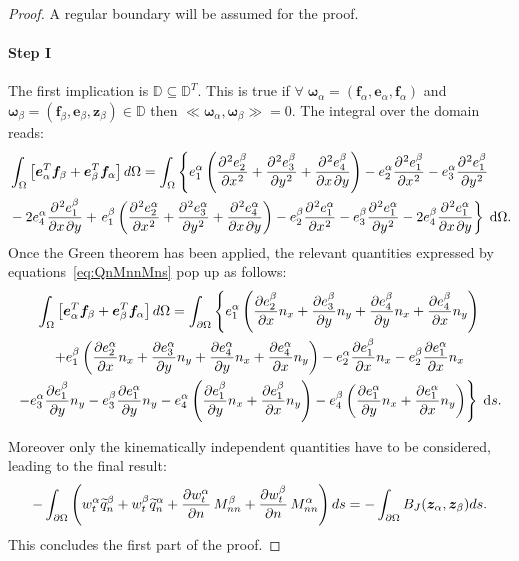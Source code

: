 \documentclass[preprint,12pt]{elsarticle}
\begin{document}
\begin{proof}
	A regular boundary will be assumed for the proof.
	\paragraph{\textbf{Step I}} 
	The first implication is $\mathbb{D} \subseteq \mathbb{D}^T$. This is true if $ \forall \;\bm\omega_\alpha = (\bm{f}_\alpha, \bm{e}_\alpha, \bm{f}_\alpha)$ and $\bm\omega_\beta = (\bm{f}_\beta, \bm{e}_\beta, \bm{z}_\beta) \in \mathbb{D}$ then $\ll \bm\omega_\alpha, \bm\omega_\beta \gg = 0$. The integral over the domain reads:
	\begin{align*}
	&\int_{\Omega}  \left[ \bm{e}_\alpha^T \bm{f}_\beta + \bm{e}_\beta^T \bm{f}_\alpha \right] d\Omega
	= \int_{\Omega} \left\{ e_1^\alpha \left( \diffp[2]{e_2^\beta}{x} + \diffp[2]{e_3^\beta}{y} + \diffp{e_4^\beta}{x,y} \right) - e_2^\alpha \diffp[2]{e_1^\beta}{x} -e_3^\alpha \diffp[2]{e_1^\beta}{y} \right.\\ 
	&  - 2 e_4^\alpha \diffp{e_1^\beta}{x,y} + 
	\left. e_1^\beta \left( \diffp[2]{e_2^\alpha}{x} + \diffp[2]{e_3^\alpha}{y} + \diffp{e_4^\alpha}{x,y} \right) - e_2^\beta \diffp[2]{e_1^\alpha}{x} -e_3^\beta \diffp[2]{e_1^\alpha}{y} - 2 e_4^\beta \diffp{e_1^\alpha}{x,y} \right\} \d{\Omega}. \\
	\end{align*}
	Once the Green theorem has been applied,  the relevant quantities expressed by equations~\eqref{eq:QnMnnMns} pop up as follows:
	\begin{multline}
	\int_{\Omega}  \left[ \bm{e}_\alpha^T \bm{f}_\beta + \bm{e}_\beta^T \bm{f}_\alpha \right] d\Omega = \int_{\partial \Omega}  \left\{ e_1^\alpha \left( \diffp{e_2^\beta}{x} n_x + \diffp{e_3^\beta}{y} n_y +\diffp{e_4^\beta}{y} n_x + \diffp{e_4^\beta}{x} n_y \right) \right. \\
	\left.   + e_1^\beta \left( \diffp{e_2^\alpha}{x} n_x + \diffp{e_3^\alpha}{y} n_y +\diffp{e_4^\alpha}{y} n_x + \diffp{e_4^\alpha}{x} n_y \right) - e_2^\alpha \diffp{e_1^\beta}{x} n_x - e_2^\beta \diffp{e_1^\alpha}{x} n_x   \right.\\
	\left. - e_3^\alpha \diffp{e_1^\beta}{y} n_y  - e_3^\beta \diffp{e_1^\alpha}{y} n_y  - e_4^\alpha \left( \diffp{e_1^\beta}{y} n_x + \diffp{e_1^\beta}{x} n_y \right) - e_4^\beta \left( \diffp{e_1^\alpha}{y} n_x + \diffp{e_1^\alpha}{x} n_y \right) \right\} \d{s}. 
	\end{multline}
	
	Moreover only the kinematically independent quantities have to be considered, leading to the final result:
	\begin{equation}
	- \int_{\partial \Omega} \left( w_t^\alpha \widetilde{q}_n^\beta + w_t^\beta \widetilde{q}_n^\alpha + \diffp{w_t^\alpha}{n} \, M_{nn}^\beta + \diffp{w_t^\beta}{n} \, M_{nn}^\alpha \right) ds =  - \int_{\partial \Omega}  B_J(\bm{z}_\alpha, \bm{z}_\beta) ds.
	\end{equation}		
	This concludes the first part of the proof.

\end{proof}
\end{document}

